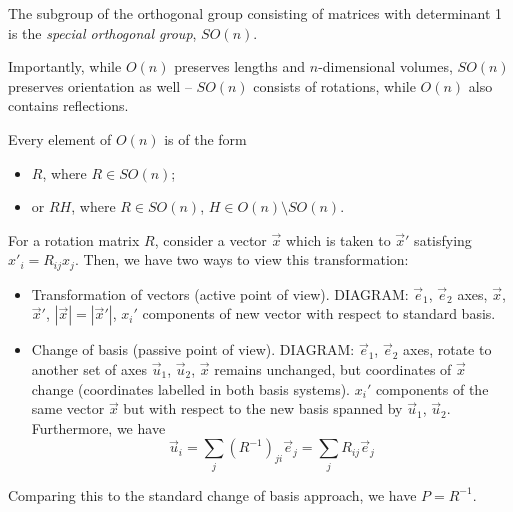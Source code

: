 \documentclass{../../template/note}
\begin{document}
    \begin{definition}
        The subgroup of the orthogonal group consisting of matrices with determinant 1 is the \emph{special orthogonal group}, \(SO(n)\).
    \end{definition}
    
    Importantly, while \(O(n)\) preserves lengths and \(n\)-dimensional volumes, \(SO(n)\) preserves orientation as well -- \(SO(n)\) consists of rotations, while \(O(n)\) also contains reflections.

    \begin{proposition}
        Every element of \(O(n)\) is of the form
        \begin{itemize}
            \item \(R\), where \(R \in SO(n)\);
            \item or \(RH\), where \(R \in SO(n)\), \(H \in O(n) \setminus SO(n)\).
        \end{itemize}
    \end{proposition}


    For a rotation matrix \(R\), consider a vector \(\vec x\) which is taken to \(\vec x'\) satisfying \(x'_i = R_{ij}x_j\). Then, we have two ways to view this transformation:
    
    \begin{itemize}
        \item Transformation of vectors (active point of view). 
        DIAGRAM: \(\vec e_1\), \(\vec e_2\) axes, \(\vec x\), \(\vec x'\), \(|\vec x| = |\vec x'|\), \(x_i'\) components of new vector with respect to standard basis.
        \item Change of basis (passive point of view).
        DIAGRAM: \(\vec e_1\), \(\vec e_2\) axes, rotate to another set of axes \(\vec u_1\), \(\vec u_2\), \(\vec x\) remains unchanged, but coordinates of \(\vec x\) change (coordinates labelled in both basis systems). \(x_i'\) components of the same vector \(\vec x\) but with respect to the new basis spanned by \(\vec u_1\), \(\vec u_2\). Furthermore, we have
        \[
            \vec u_i = \sum_j (R^{-1})_{ji} \vec e_j = \sum_j R_{ij} \vec e_j
        \]
    \end{itemize}
    
    \begin{remark*}
        Comparing this to the standard change of basis approach, we have \(P = R^{-1}\).
    \end{remark*}
    
\end{document}
